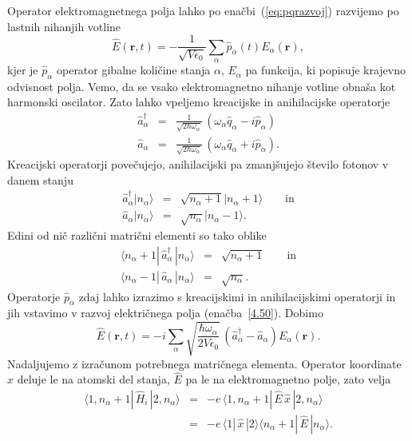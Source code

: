 Operator elektromagnetnega polja lahko po enačbi~(\ref{eq:pqrazvoj}) 
razvijemo po lastnih nihanjih votline 
\begin{equation}
\hat{E}(\mathbf{r},t)=-\frac{1}{\sqrt{V\epsilon_{0}}}\sum_{\alpha}
\hat{p}_{\alpha}(t)E_{\alpha}(\mathbf{r}),
\label{4.50}
\end{equation}
kjer je $\hat{p}_{\alpha}$ operator gibalne količine stanja $\alpha$, $E_{\alpha}$
pa funkcija, ki popisuje krajevno odvisnost polja. Vemo, da se vsako 
elektromagnetno nihanje votline obnaša kot harmonski oscilator.
Zato lahko vpeljemo kreacijske in anihilacijske operatorje
\begin{eqnarray}
\hat{a}_{\alpha}^{\dagger} & = & \frac{1}{\sqrt{2\hbar\omega_{\alpha}}}\,
(\omega_{\alpha}\hat{q}_{\alpha}-i\hat{p}_{\alpha}) \\
\hat{a}_{\alpha} & = & \frac{1}{\sqrt{2\hbar\omega_{\alpha}}}\,(\omega_{\alpha}\hat{q}_{\alpha}+i\hat{p}_{\alpha}).
\end{eqnarray}
 Kreacijski operatorji povečujejo, anihilacijski pa zmanjšujejo število
fotonov v danem stanju
\begin{eqnarray}
\hat{a}_{\alpha}^{\dagger}|n_{\alpha}\rangle & = & \sqrt{n_{\alpha}+1}
|n_{\alpha}+1\rangle\qquad \mathrm{in} \\
\hat{a}_{\alpha}|n_{\alpha}\rangle & = & \sqrt{n_{\alpha}}|n_{\alpha}-1\rangle.
\end{eqnarray}
Edini od nič različni matrični elementi so tako oblike
\begin{eqnarray}
\langle n_\alpha +1|\, \hat{a}_{\alpha}^{\dagger}\,|n_{\alpha}\rangle & = 
& \sqrt{n_{\alpha}+1} \qquad \mathrm{in} \nonumber\\
\langle n_\alpha-1|\,\hat{a}_{\alpha}\,|n_{\alpha}\rangle & = & \sqrt{n_{\alpha}}.
\label{eq:ankr}
\end{eqnarray}
Operatorje $\hat{p}_{\alpha}$ zdaj lahko izrazimo s kreacijskimi in anihilacijskimi
operatorji in jih vstavimo v razvoj električnega polja (enačba~\ref{4.50}). Dobimo
\begin{equation}
\hat{E}(\mathbf{r},t)=-i\sum_{\alpha}\sqrt{\frac{\hbar\omega_{\alpha}}{2V\epsilon_{0}}}\,
\left(\hat{a}_{\alpha}^{\dagger}-\hat{a}_{\alpha}\right)E_{\alpha}(\mathbf{r}).
\label{4.53}
\end{equation}
Nadaljujemo z izračunom potrebnega matričnega elementa. Operator koordinate
$\hat{x}$ deluje le na atomski del stanja, $\hat{E}$ pa le na elektromagnetno
polje, zato velja 
\begin{eqnarray}
\langle1,n_{\alpha}+1|\,\hat{H}_{i}\,|2,n_{\alpha}\rangle & = & -e\,
\langle1,n_{\alpha}+1|\,\hat{E}\,\hat{x}\,|2,n_{\alpha}\rangle \\
 & = & -e\,\langle1|\,\hat{x}\,|2\rangle\langle n_{\alpha}+1|\,\hat{E}\,|n_{\alpha}\rangle.
\end{eqnarray}
